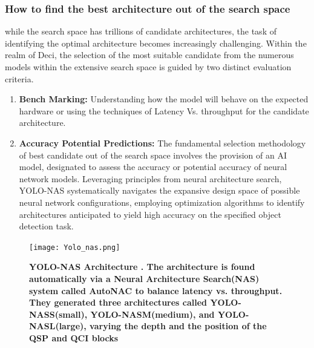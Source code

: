 \subsubsection{How to find the best architecture out of the search space}
while the search space has trillions of candidate architectures, the task of identifying the optimal architecture becomes increasingly challenging. Within the realm of Deci, the selection of the most suitable candidate from the numerous models within the extensive search space is guided by two distinct evaluation criteria. \cite{yolo-nas-webinar}
\begin{enumerate}
    \item \textbf{Bench Marking: } Understanding how the model will behave on the expected hardware or using the techniques of Latency Vs. throughput for the candidate architecture. \\
    \item \textbf{Accuracy Potential Predictions: } The fundamental selection methodology of best candidate out of the search space involves the provision of an AI model, designated to assess the accuracy or potential accuracy of neural network models. Leveraging principles from neural architecture search, YOLO-NAS systematically navigates the expansive design space of possible neural network configurations, employing optimization algorithms to identify architectures anticipated to yield high accuracy on the specified object detection task.
\end{enumerate}
 \begin{figure}[H]
     \centering
     \texttt{[image: Yolo\_nas.png]}
     \caption{\textbf{YOLO-NAS Architecture \cite{YOLO-NAS}. The architecture is found automatically via a Neural Architecture Search(NAS) system called AutoNAC to balance latency vs. throughput. They generated three architectures called YOLO-NASS(small), YOLO-NASM(medium), and YOLO-NASL(large), varying the depth and the position of the QSP and QCI blocks \cite{YOLO-NAS}}}
     \label{fig:YOLO-NAS Architecture.}
\end{figure}


